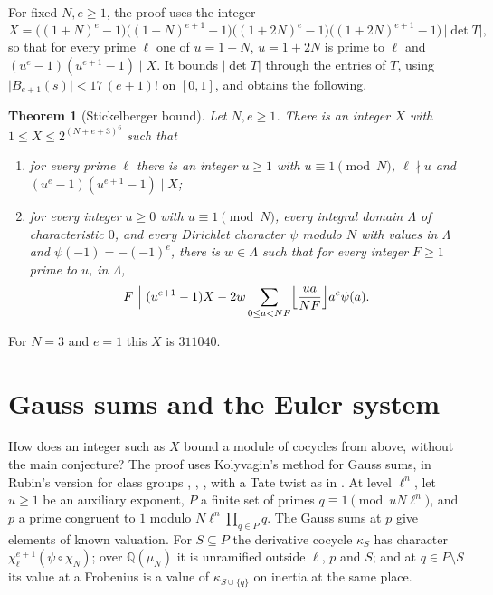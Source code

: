 \documentclass[reqno]{amsart}
\theoremstyle{definition}
\theoremstyle{plain}
\newtheorem{theorem}{Theorem}[section]
\newcommand{\Q}{\mathbb{Q}}
\begin{document}
For fixed \(N,e\ge1\), the proof uses the integer
\[
 X=\bigl((1+N)^e-1\bigr)\bigl((1+N)^{e+1}-1\bigr)\bigl((1+2N)^e-1\bigr)\bigl((1+2N)^{e+1}-1\bigr)\,\lvert\det T\rvert,
\]
so that for every prime \(\ell\) one of \(u=1+N\), \(u=1+2N\) is prime to \(\ell\) and \((u^e-1)(u^{e+1}-1)\mid X\).  It bounds \(\lvert\det T\rvert\) through the entries of \(T\), using \(\lvert B_{e+1}(s)\rvert<17\,(e+1)!\) on \([0,1]\), and obtains the following.

\begin{theorem}[Stickelberger bound]\label{thm:stick}
Let \(N,e\ge1\).  There is an integer \(X\) with \(1\le X\le2^{(N+e+3)^6}\) such that
\begin{enumerate}
\item[(a)] for every prime \(\ell\) there is an integer \(u\ge1\) with \(u\equiv1\pmod N\), \(\ell\nmid u\) and \((u^e-1)(u^{e+1}-1)\mid X\);
\item[(b)] for every integer \(u\ge0\) with \(u\equiv1\pmod N\), every integral domain \(\Lambda\) of characteristic \(0\), and every Dirichlet character \(\psi\) modulo \(N\) with values in \(\Lambda\) and \(\psi(-1)=-(-1)^e\), there is \(w\in\Lambda\) such that for every integer \(F\ge1\) prime to \(u\), in \(\Lambda\),
\[
 F\ \Big|\ (u^{e+1}-1)X-2w\sum_{0\le a<NF}\Bigl\lfloor\frac{ua}{NF}\Bigr\rfloor a^e\psi(a).
\]
\end{enumerate}
\end{theorem}

For \(N=3\) and \(e=1\) this \(X\) is \(311040\).  

\section{Gauss sums and the Euler system}\label{sec:euler}

How does an integer such as \(X\) bound a module of cocycles from above, without the main conjecture?  The proof uses Kolyvagin's method for Gauss sums, in Rubin's version for class groups \cite{Ru91}, \cite[Appendix]{La}, \cite{Gr}, with a Tate twist as in \cite{BG}.  At level \(\ell^n\), let \(u\ge1\) be an auxiliary exponent, \(P\) a finite set of primes \(q\equiv1\pmod{uN\ell^n}\), and \(p\) a prime congruent to \(1\) modulo \(N\ell^n\prod_{q\in P}q\).  The Gauss sums at \(p\) give elements of known valuation.  For \(S\subseteq P\) the derivative cocycle \(\kappa_S\) has character \(\chi_\ell^{e+1}(\psi\circ\chi_N)\); over \(\Q(\mu_N)\) it is unramified outside \(\ell\), \(p\) and \(S\); and at \(q\in P\setminus S\) its value at a Frobenius is a value of \(\kappa_{S\cup\{q\}}\) on inertia at the same place.
\end{document}

